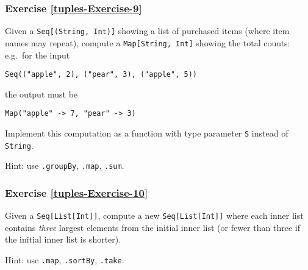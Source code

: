 \subsubsection{Exercise \label{tuples-Exercise-9}\ref{tuples-Exercise-9}}

Given a \lstinline!Seq[(String, Int)]!
showing a list of purchased items (where item names may repeat), compute
a \lstinline!Map[String, Int]!
showing the total counts: e.g.~for the input 
\begin{lstlisting}
Seq(("apple", 2), ("pear", 3), ("apple", 5))
\end{lstlisting}
the output must be 
\begin{lstlisting}
Map("apple" -> 7, "pear" -> 3)
\end{lstlisting}
Implement this computation as a function with type parameter \lstinline!S!
instead of \lstinline!String!. 

Hint: use \lstinline!.groupBy!,
\lstinline!.map!, \lstinline!.sum!.

\subsubsection{Exercise \label{tuples-Exercise-10}\ref{tuples-Exercise-10}}

Given a \lstinline!Seq[List[Int]]!,
compute a new \lstinline!Seq[List[Int]]!
where each inner list contains \emph{three} largest elements from
the initial inner list (or fewer than three if the initial inner list
is shorter).

Hint: use \lstinline!.map!,
\lstinline!.sortBy!, \lstinline!.take!.%
\begin{comment}
Solution:\inputencoding{latin9}
\begin{lstlisting}
numsLists.map(_.sortBy(-_).take(3))
\end{lstlisting}
\inputencoding{utf8}\end{comment}



